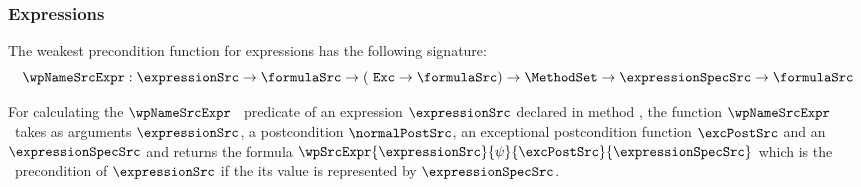 \subsubsection{Expressions}\label{pog:wpSrc:wpExpr}
The weakest precondition function for expressions has the following signature:
$$ \wpNameSrcExpr : \expressionSrc \rightarrow \formulaSrc \rightarrow ( \mbox{ \rm \texttt{Exc}} \rightarrow  \formulaSrc ) \rightarrow  
\MethodSet \rightarrow   \expressionSpecSrc \rightarrow  \formulaSrc $$

For calculating the  $\wpNameSrcExpr$  \ predicate  of  an expression $\expressionSrc$ declared in method \methodd,
 the function $\wpNameSrcExpr$ \ takes as arguments  $\expressionSrc$, a postcondition $\normalPostSrc$, an exceptional postcondition 
function $\excPostSrc$  and  an $\expressionSpecSrc$ and returns the    formula 
$\wpSrcExpr{\expressionSrc}{\psi}{\excPostSrc}{ \expressionSpecSrc}$ which is the \wpName \ precondition of $\expressionSrc$ 
if the its value is represented by $\expressionSpecSrc$.

